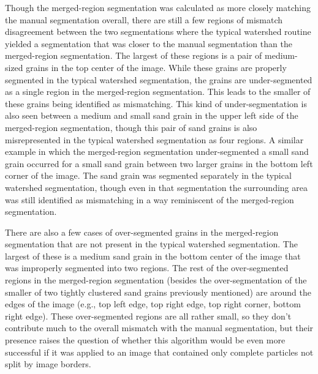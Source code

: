 Though the merged-region segmentation was calculated as more closely
matching the manual segmentation overall, there are still a few regions of
mismatch disagreement between the two segmentations where the typical watershed
routine yielded a segmentation that was closer to the manual segmentation
than the merged-region segmentation. The largest of these
regions is a pair of medium-sized grains in the top center of the image. While
these grains are properly segmented in the typical watershed segmentation, the
grains are under-segmented as a single region in the merged-region segmentation.
This leads to the smaller of these grains being identified as mismatching.
This kind of under-segmentation is also seen between a medium and small sand grain
in the upper left side of the merged-region segmentation, though this pair of sand
grains is also misrepresented in the typical watershed segmentation as four regions.
A similar example in which the merged-region segmentation under-segmented a small
sand grain occurred for a small sand grain between two larger grains in the bottom
left corner of the image. The sand grain was segmented separately in the typical
watershed segmentation, though even in that segmentation the surrounding
area was still identified as mismatching in a way reminiscent of the
merged-region segmentation.

There are also a few cases of over-segmented grains in the merged-region
segmentation that are not present in the typical watershed segmentation. The
largest of these is a medium sand grain in the bottom center of the image that
was improperly segmented into two regions. The rest of the over-segmented regions
in the merged-region segmentation (besides the over-segmentation of the smaller of
two tightly clustered sand grains previously mentioned) are around the edges of the
image (e.g., top left edge, top right edge, top right corner, bottom right edge).
These over-segmented regions are all rather small, so they don't contribute much to
the overall mismatch with the manual segmentation, but their presence raises the
question of whether this algorithm would be even more successful if it was applied
to an image that contained only complete particles not split by image borders.

